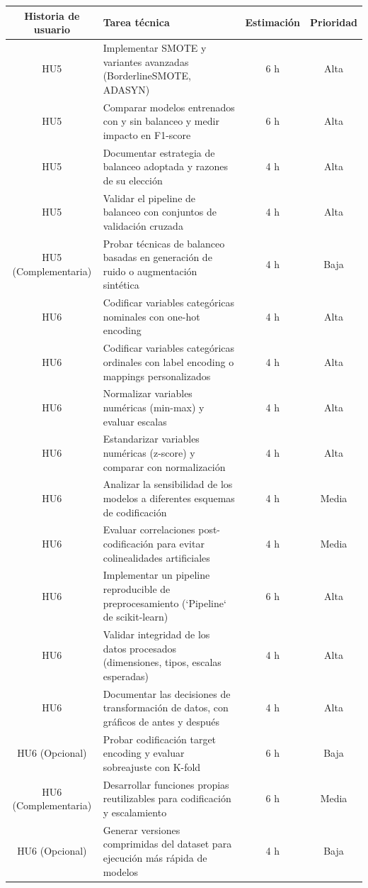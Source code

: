 \documentclass[
11pt, %
]{charter}
\begin{document}
\begin{table}[htpb]
\centering
\begin{tabularx}{\linewidth}{@{}|c|X|c|c|@{}}
\hline
\rowcolor[HTML]{C0C0C0}
Historia de usuario & Tarea técnica & Estimación & Prioridad \\ \hline

HU5 & Implementar SMOTE y variantes avanzadas (BorderlineSMOTE, ADASYN) & 6 h & Alta \\ \hline
HU5 & Comparar modelos entrenados con y sin balanceo y medir impacto en F1-score & 6 h & Alta \\ \hline
HU5 & Documentar estrategia de balanceo adoptada y razones de su elección & 4 h & Alta \\ \hline
HU5 & Validar el pipeline de balanceo con conjuntos de validación cruzada & 4 h & Alta \\ \hline
HU5 (Complementaria) & Probar técnicas de balanceo basadas en generación de ruido o augmentación sintética & 4 h & Baja \\ \hline

HU6 & Codificar variables categóricas nominales con one-hot encoding & 4 h & Alta \\ \hline
HU6 & Codificar variables categóricas ordinales con label encoding o mappings personalizados & 4 h & Alta \\ \hline
HU6 & Normalizar variables numéricas (min-max) y evaluar escalas & 4 h & Alta \\ \hline
HU6 & Estandarizar variables numéricas (z-score) y comparar con normalización & 4 h & Alta \\ \hline
HU6 & Analizar la sensibilidad de los modelos a diferentes esquemas de codificación & 4 h & Media \\ \hline
HU6 & Evaluar correlaciones post-codificación para evitar colinealidades artificiales & 4 h & Media \\ \hline
HU6 & Implementar un pipeline reproducible de preprocesamiento (`Pipeline` de scikit-learn) & 6 h & Alta \\ \hline
HU6 & Validar integridad de los datos procesados (dimensiones, tipos, escalas esperadas) & 4 h & Alta \\ \hline
HU6 & Documentar las decisiones de transformación de datos, con gráficos de antes y después & 4 h & Alta \\ \hline


HU6 (Opcional) & Probar codificación target encoding y evaluar sobreajuste con K-fold & 6 h & Baja \\ \hline
HU6 (Complementaria) & Desarrollar funciones propias reutilizables para codificación y escalamiento & 6 h & Media \\ \hline
HU6 (Opcional) & Generar versiones comprimidas del dataset para ejecución más rápida de modelos & 4 h & Baja \\ \hline


\end{tabularx}
\end{table}
\end{document}
